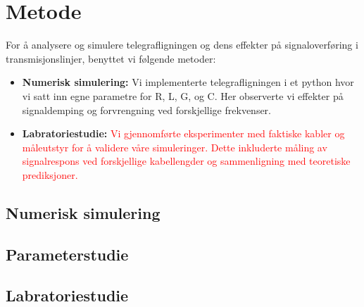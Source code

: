 \section{Metode}
    For å analysere og simulere telegrafligningen og dens effekter på signaloverføring i transmisjonslinjer, benyttet vi følgende metoder:
    
    \begin{itemize}
        
        \item \textbf{Numerisk simulering:} Vi implementerte telegrafligningen i et python hvor vi satt inn egne parametre for R, L, G, og C. Her observerte vi effekter på signaldemping og forvrengning ved forskjellige frekvenser.
        \item \textbf{Labratoriestudie:}\textcolor{red}{ Vi gjennomførte eksperimenter med faktiske kabler og måleutstyr for å validere våre simuleringer. Dette inkluderte måling av signalrespons ved forskjellige kabellengder og sammenligning med teoretiske prediksjoner.}
    \end{itemize}
\subsection{Numerisk simulering}
    
\subsection{Parameterstudie}

\subsection{Labratoriestudie}

